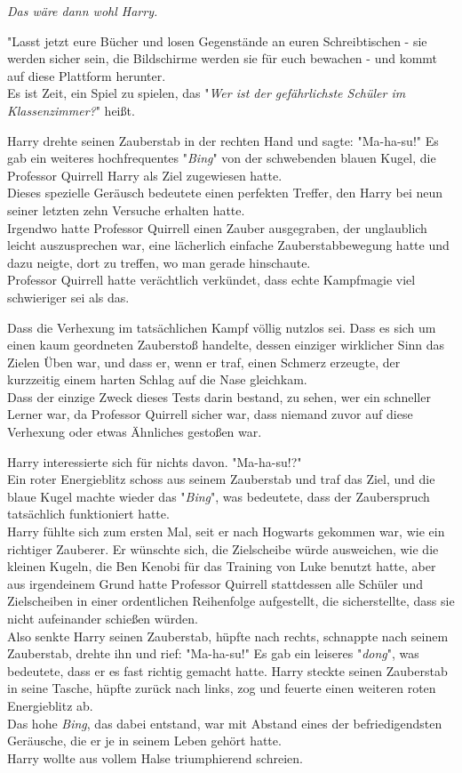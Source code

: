{\emph{Das wäre dann wohl Harry.}

"Lasst jetzt eure Bücher und losen Gegenstände an euren Schreibtischen - sie werden sicher sein, die Bildschirme werden sie für euch bewachen - und kommt auf diese Plattform herunter.\\ Es ist Zeit, ein Spiel zu spielen, das "\emph{Wer ist der gefährlichste Schüler im Klassenzimmer?}" heißt.

Harry drehte seinen Zauberstab in der rechten Hand und sagte: "Ma-ha-su!" Es gab ein weiteres hochfrequentes "\emph{Bing}" von der schwebenden blauen Kugel, die Professor Quirrell Harry als Ziel zugewiesen hatte.\\ Dieses spezielle Geräusch bedeutete einen perfekten Treffer, den Harry bei neun seiner letzten zehn Versuche erhalten hatte.\\ Irgendwo hatte Professor Quirrell einen Zauber ausgegraben, der unglaublich leicht auszusprechen war, eine lächerlich einfache Zauberstabbewegung hatte und dazu neigte, dort zu treffen, wo man gerade hinschaute.\\ Professor Quirrell hatte verächtlich verkündet, dass echte Kampfmagie viel schwieriger sei als das.

Dass die Verhexung im tatsächlichen Kampf völlig nutzlos sei. Dass es sich um einen kaum geordneten Zauberstoß handelte, dessen einziger wirklicher Sinn das Zielen Üben war, und dass er, wenn er traf, einen Schmerz erzeugte, der kurzzeitig einem harten Schlag auf die Nase gleichkam.\\ Dass der einzige Zweck dieses Tests darin bestand, zu sehen, wer ein schneller Lerner war, da Professor Quirrell sicher war, dass niemand zuvor auf diese Verhexung oder etwas Ähnliches gestoßen war.

Harry interessierte sich für nichts davon. "Ma-ha-su!?"\\ Ein roter Energieblitz schoss aus seinem Zauberstab und traf das Ziel, und die blaue Kugel machte wieder das "\emph{Bing}", was bedeutete, dass der Zauberspruch tatsächlich funktioniert hatte.\\ Harry fühlte sich zum ersten Mal, seit er nach Hogwarts gekommen war, wie ein richtiger Zauberer. Er wünschte sich, die Zielscheibe würde ausweichen, wie die kleinen Kugeln, die Ben Kenobi für das Training von Luke benutzt hatte, aber aus irgendeinem Grund hatte Professor Quirrell stattdessen alle Schüler und Zielscheiben in einer ordentlichen Reihenfolge aufgestellt, die sicherstellte, dass sie nicht aufeinander schießen würden.\\ Also senkte Harry seinen Zauberstab, hüpfte nach rechts, schnappte nach seinem Zauberstab, drehte ihn und rief: "Ma-ha-su!" Es gab ein leiseres "\emph{dong}", was bedeutete, dass er es fast richtig gemacht hatte. Harry steckte seinen Zauberstab in seine Tasche, hüpfte zurück nach links, zog und feuerte einen weiteren roten Energieblitz ab.\\ Das hohe \emph{Bing}, das dabei entstand, war mit Abstand eines der befriedigendsten Geräusche, die er je in seinem Leben gehört hatte.\\ Harry wollte aus vollem Halse triumphierend schreien.

}

